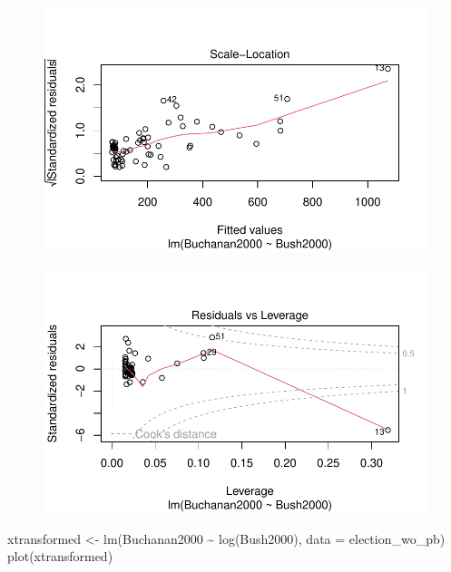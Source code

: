 \documentclass[
  letterpaper,
  DIV=11,
  numbers=noendperiod]{scrartcl}
\newenvironment{Shaded}{\begin{snugshade}}{\end{snugshade}}
\newcommand{\AttributeTok}[1]{\textcolor[rgb]{0.40,0.45,0.13}{#1}}
\newcommand{\FunctionTok}[1]{\textcolor[rgb]{0.28,0.35,0.67}{#1}}
\newcommand{\NormalTok}[1]{\textcolor[rgb]{0.00,0.23,0.31}{#1}}
\newcommand{\OtherTok}[1]{\textcolor[rgb]{0.00,0.23,0.31}{#1}}
\newcommand{\SpecialCharTok}[1]{\textcolor[rgb]{0.37,0.37,0.37}{#1}}
\begin{document}
\begin{figure}[H]

{\centering \includegraphics{case_study_1_files/figure-pdf/unnamed-chunk-2-3.pdf}

}

\end{figure}

\begin{figure}[H]

{\centering \includegraphics{case_study_1_files/figure-pdf/unnamed-chunk-2-4.pdf}

}

\end{figure}

\begin{Shaded}
\begin{Highlighting}[]
\NormalTok{xtransformed }\OtherTok{\textless{}{-}} \FunctionTok{lm}\NormalTok{(Buchanan2000 }\SpecialCharTok{\textasciitilde{}} \FunctionTok{log}\NormalTok{(Bush2000), }\AttributeTok{data =}\NormalTok{ election\_wo\_pb)}
\FunctionTok{plot}\NormalTok{(xtransformed)}
\end{Highlighting}
\end{Shaded}
\end{document}
